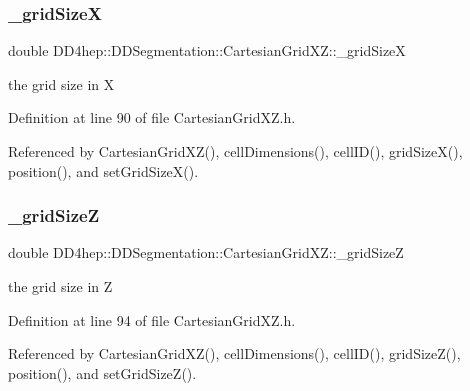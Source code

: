 \subsubsection{\texorpdfstring{\+\_\+grid\+SizeX}{\_gridSizeX}}
{\footnotesize\ttfamily double D\+D4hep\+::\+D\+D\+Segmentation\+::\+Cartesian\+Grid\+X\+Z\+::\+\_\+grid\+SizeX\hspace{0.3cm}{\ttfamily [protected]}}



the grid size in X 



Definition at line 90 of file Cartesian\+Grid\+X\+Z.\+h.



Referenced by Cartesian\+Grid\+X\+Z(), cell\+Dimensions(), cell\+I\+D(), grid\+Size\+X(), position(), and set\+Grid\+Size\+X().

\hypertarget{class_d_d4hep_1_1_d_d_segmentation_1_1_cartesian_grid_x_z_a7de343951b44cd52f5953f6f016d0e25}{}\label{class_d_d4hep_1_1_d_d_segmentation_1_1_cartesian_grid_x_z_a7de343951b44cd52f5953f6f016d0e25} 
\subsubsection{\texorpdfstring{\+\_\+grid\+SizeZ}{\_gridSizeZ}}
{\footnotesize\ttfamily double D\+D4hep\+::\+D\+D\+Segmentation\+::\+Cartesian\+Grid\+X\+Z\+::\+\_\+grid\+SizeZ\hspace{0.3cm}{\ttfamily [protected]}}



the grid size in Z 



Definition at line 94 of file Cartesian\+Grid\+X\+Z.\+h.



Referenced by Cartesian\+Grid\+X\+Z(), cell\+Dimensions(), cell\+I\+D(), grid\+Size\+Z(), position(), and set\+Grid\+Size\+Z().

\hypertarget{class_d_d4hep_1_1_d_d_segmentation_1_1_cartesian_grid_x_z_aa6bb5820863cb39d75382042623e0b6c}{}\label{class_d_d4hep_1_1_d_d_segmentation_1_1_cartesian_grid_x_z_aa6bb5820863cb39d75382042623e0b6c} 

